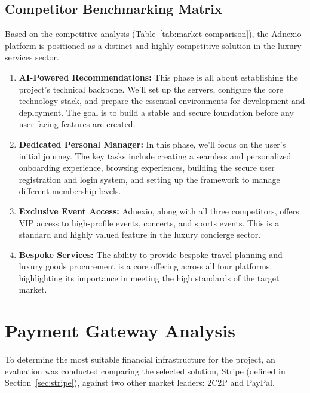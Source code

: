 \subsection{Competitor Benchmarking Matrix}

Based on the competitive analysis (Table~\ref{tab:market-comparison}), the Adnexio platform is positioned as a distinct and highly competitive solution in the luxury services sector.
\begin{enumerate}                                                                  
  \item \textbf{AI-Powered Recommendations:} This phase is all about establishing the project's technical backbone. We'll set up the servers, configure the core technology stack, and prepare the essential environments for development and deployment. The goal is to build a stable and secure foundation before any user-facing features are created.                                
                                                     
  \item \textbf{Dedicated Personal Manager:} In this phase, we'll focus on the user's initial journey. The key tasks include creating a seamless and personalized onboarding experience, browsing experiences, building the secure user registration and login system, and setting up the framework to manage different membership levels.       
                                                     
  \item \textbf{Exclusive Event Access:} Adnexio, along with all three competitors, offers VIP access to high-profile events, concerts, and sports events. This is a standard and highly valued feature in the luxury concierge sector.       
                                                     
  \item \textbf{Bespoke Services:} The ability to provide bespoke travel planning and luxury goods procurement is a core offering across all four platforms, highlighting its importance in meeting the high standards of the target market.       
\end{enumerate}
\section{Payment Gateway Analysis}
To determine the most suitable financial infrastructure for the project, an evaluation was conducted comparing the selected solution, Stripe (defined in Section~\ref{sec:stripe}), against two other market leaders: 2C2P and PayPal.

